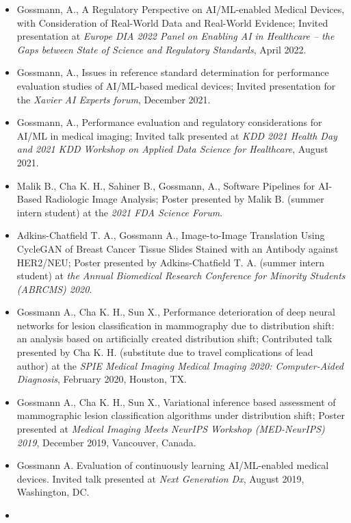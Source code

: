 \documentclass[overlapped, line, 10pt]{res} %
\begin{document}
\begin{resume}
\begin{itemize}
  \item Gossmann, A., A Regulatory Perspective on AI/ML-enabled Medical Devices, with Consideration of Real-World Data and Real-World Evidence;
    Invited presentation at \textit{Europe DIA 2022 Panel on Enabling AI in Healthcare -- the Gaps between State of Science and Regulatory Standards}, April 2022.
  \item Gossmann, A., Issues in reference standard determination for performance evaluation studies of AI/ML-based medical devices;
    Invited presentation for the \textit{Xavier AI Experts forum}, December 2021.
  \item Gossmann, A., Performance evaluation and regulatory considerations for AI/ML in medical imaging;
    Invited talk presented at \textit{KDD 2021 Health Day and 2021 KDD Workshop on Applied Data Science for Healthcare}, August 2021.
  \item
    Malik B., Cha K. H., Sahiner B., Gossmann, A., Software Pipelines for AI-Based Radiologic Image Analysis;
    Poster presented by Malik B. (summer intern student) at the \textit{2021 FDA Science Forum}.
  \item 
    Adkins-Chatfield T. A., Gossmann A., Image-to-Image Translation Using CycleGAN of Breast Cancer Tissue Slides Stained with an Antibody against HER2/NEU;
    Poster presented by Adkins-Chatfield T. A. (summer intern student) at \textit{the Annual Biomedical Research Conference for Minority Students (ABRCMS) 2020}.
  \item
    Gossmann A., Cha K. H., Sun X., Performance deterioration of deep neural networks for lesion classification in mammography due to distribution shift: an analysis based on artificially created distribution shift;
    Contributed talk presented by Cha K. H. (substitute due to travel complications of lead author) at the \textit{SPIE Medical Imaging Medical Imaging 2020: Computer-Aided Diagnosis},
    February 2020, Houston, TX.
  \item Gossmann A., Cha K. H., Sun X., Variational inference based assessment of mammographic lesion classification algorithms under distribution shift;
    Poster presented at \textit{Medical Imaging Meets NeurIPS Workshop (MED-NeurIPS) 2019},
    December 2019, Vancouver, Canada.
  \item
    Gossmann A. Evaluation of continuously learning AI/ML-enabled medical devices.
    Invited talk presented at \textit{Next Generation Dx},
    August 2019, Washington, DC.
  \item

\end{itemize}
\end{resume}
\end{document}

